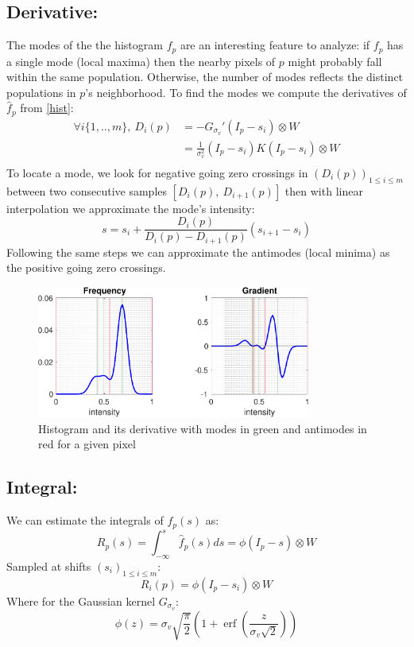 \documentclass{acmsiggraph}
\newcommand{\Gv}{G_{\mathit{\sigma_v}}}
\DeclareMathOperator\erf{erf}
\begin{document}
\subsection{Derivative:}
The modes of the the histogram $f_p$ are an interesting feature to analyze: if $f_p$ has a single mode (local maxima) then the nearby pixels of $p$ might probably fall within the same population. Otherwise, the number of modes reflects the distinct populations in $p$'s neighborhood. To find the modes we compute the derivatives of $\hat f_p$ from \ref{hist}:
\begin{equation}
\begin{split}
\forall i\{1,..,m\},\: D_i(p) & = - \Gv'(I_p-s_i)\otimes W \\
       & = \frac{1}{\sigma_v^2}(I_p-s_i)K(I_p-s_i)\otimes W\\
\end{split}
\end{equation}
To locate a mode, we look for negative going zero crossings in $(D_i(p))_{1\leq i\leq m}$ between two consecutive samples $[D_i(p),\: D_{i+1}(p)]$ then with linear interpolation we approximate the mode's intensity:
\[s = s_i + \frac{D_i(p)}{D_i(p) - D_{i+1}(p)}(s_{i+1}-s_i)\]
Following the same steps we can approximate the antimodes (local minima) as the positive going zero crossings.
\begin{figure}[H]
\centering
\includegraphics[width=9cm]{modes}
\caption{Histogram and its derivative with modes in green and antimodes in red for a given pixel}
\end{figure} 

\subsection{Integral:}
We can estimate the integrals of $f_p(s)$ as:
\[
R_p(s) = \int_{-\infty}^s \hat f_p(s) ds = \phi(I_p-s)\otimes W
\]
Sampled at shifts $(s_i)_{1\leq i\leq m}$:
\begin{equation}
R_i(p) = \phi(I_p-s_i)\otimes W
\end{equation}
Where for the Gaussian kernel $\Gv$:
\[\phi(z) = \sigma_v \sqrt{\frac{\pi}{2}} \left(1 + \erf\left(\frac{z}{\sigma_v\sqrt{2}}\right)\right)\]
\end{document}
